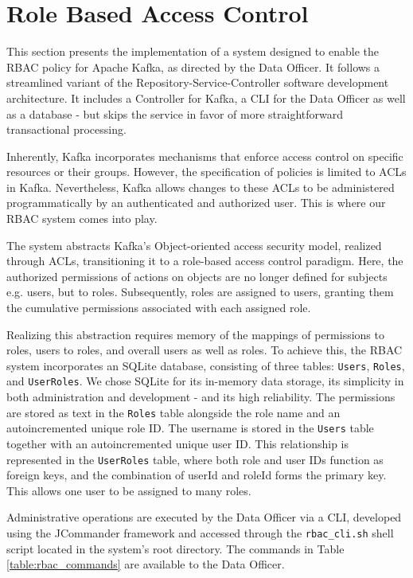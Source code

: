 \section{Role Based Access Control}
This section presents the implementation of a system designed to enable the \acf{RBAC} policy for Apache Kafka, as directed by the Data Officer. It follows a streamlined variant of the Repository-Service-Controller software development architecture. It includes a Controller for Kafka, a \ac{CLI} for the Data Officer as well as a database - but skips the service in favor of more straightforward transactional processing. \par
Inherently, Kafka incorporates mechanisms that enforce access control on specific resources or their groups. However, the specification of policies is limited to \acp{ACL} in Kafka. Nevertheless, Kafka allows changes to these \acp{ACL} to be administered programmatically by an authenticated and authorized user. This is where our \ac{RBAC} system comes into play. \par
The system abstracts Kafka's Object-oriented access security model, realized through \acp{ACL}, transitioning it to a role-based access control paradigm. Here, the authorized permissions of actions on objects are no longer defined for subjects e.g. users, but to roles. Subsequently, roles are assigned to users, granting them the cumulative permissions associated with each assigned role. \par
Realizing this abstraction requires memory of the mappings of permissions to roles, users to roles, and overall users as well as roles. To achieve this, the \ac{RBAC} system incorporates an SQLite \cite{sqlite} database, consisting of three tables: \texttt{Users}, \texttt{Roles}, and \texttt{UserRoles}. We chose SQLite for its in-memory data storage, its simplicity in both administration and development - and its high reliability. The permissions are stored as text in the \texttt{Roles} table alongside the role name and an autoincremented unique role ID. The username is stored in the \texttt{Users} table together with an autoincremented unique user ID. This relationship is represented in the \texttt{UserRoles} table, where both role and user IDs function as foreign keys, and the combination of userId and roleId forms the primary key. This allows one user to be assigned to many roles. \par
Administrative operations are executed by the Data Officer via a \ac{CLI}, developed using the JCommander framework \cite{jcommander} and accessed through the \texttt{rbac\_cli.sh} shell script located in the system's root directory. The commands in Table \ref{table:rbac_commands} are available to the Data Officer.

